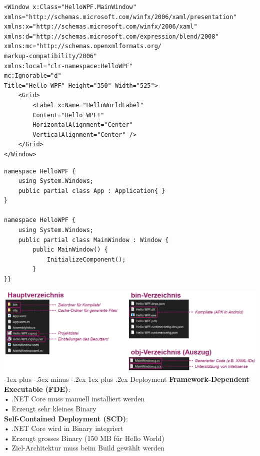\documentclass[10pt,landscape,a4paper]{article}
\makeatletter
\renewcommand{\subsubsection}{\@startsection{subsubsection}{3}{0mm}%
                                {-1ex plus -.5ex minus -.2ex}%
                                {1ex plus .2ex}%
                                {\normalfont\footnotesize\bfseries}}
\makeatother
\begin{document}
\begin{multicols*}{3}
\begin{verbatim}
<Window x:Class="HelloWPF.MainWindow"
xmlns="http://schemas.microsoft.com/winfx/2006/xaml/presentation"
xmlns:x="http://schemas.microsoft.com/winfx/2006/xaml"
xmlns:d="http://schemas.microsoft.com/expression/blend/2008"
xmlns:mc="http://schemas.openxmlformats.org/
markup-compatibility/2006"
xmlns:local="clr-namespace:HelloWPF"
mc:Ignorable="d"
Title="Hello WPF" Height="350" Width="525">
    <Grid>
        <Label x:Name="HelloWorldLabel"
        Content="Hello WPF!"
        HorizontalAlignment="Center"
        VerticalAlignment="Center" />
    </Grid>
</Window>
\end{verbatim}
\begin{verbatim}
namespace HelloWPF {
    using System.Windows;
    public partial class App : Application{ }
}

namespace HelloWPF {   
    using System.Windows;
    public partial class MainWindow : Window {
        public MainWindow() {
            InitializeComponent();
        }
}}
\end{verbatim}
\includegraphics[scale=0.3]{images/generatedCode.PNG}
\subsubsection{Deployment}
\textbf{Framework-Dependent Executable (FDE)}:\\
• .NET Core muss manuell installiert werden\\
• Erzeugt sehr kleines Binary\\
\textbf{Self-Contained Deployment (SCD)}:\\
• .NET Core wird in Binary integriert\\
• Erzeugt grosses Binary (150 MB für Hello World)\\
• Ziel-Architektur muss beim Build gewählt werden


\end{multicols*}
\end{document}
